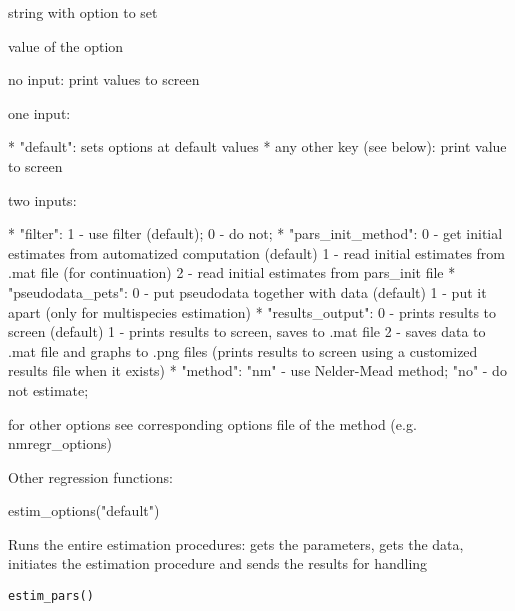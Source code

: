 \documentclass[a4paper]{book}
\begin{document}
%
\begin{Arguments}
\begin{ldescription}
\item[\code{key}] string with option to set

\item[\code{val}] value of the option
\end{ldescription}
\end{Arguments}
%
\begin{Details}\relax
no input: print values to screen

one input:

* "default": sets options at default values
* any other key (see below): print value to screen

two inputs:

* "filter": 1 - use filter (default); 0 - do not;
* "pars\_init\_method":
0 - get initial estimates from automatized computation (default)
1 - read initial estimates from .mat file (for continuation)
2 - read initial estimates from pars\_init file
* "pseudodata\_pets":
0 - put pseudodata together with data (default)
1 - put it apart (only for multispecies estimation)
* "results\_output":
0 - prints results to screen (default)
1 - prints results to screen, saves to .mat file
2 - saves data to .mat file and graphs to .png files
(prints results to screen using a customized results file when it exists)
* "method": "nm" - use Nelder-Mead method; "no" - do not estimate;

for other options see corresponding options file of the method (e.g. nmregr\_options)
\end{Details}
%
\begin{SeeAlso}\relax
Other regression functions: 
\end{SeeAlso}
%
\begin{Examples}
\begin{ExampleCode}
estim_options("default")
\end{ExampleCode}
\end{Examples}
%
\begin{Description}\relax
Runs the entire estimation procedures: gets the parameters, gets the data, initiates the estimation procedure and sends the results for handling
\end{Description}
%
\begin{Usage}
\begin{verbatim}
estim_pars()
\end{verbatim}
\end{Usage}
\end{document}
